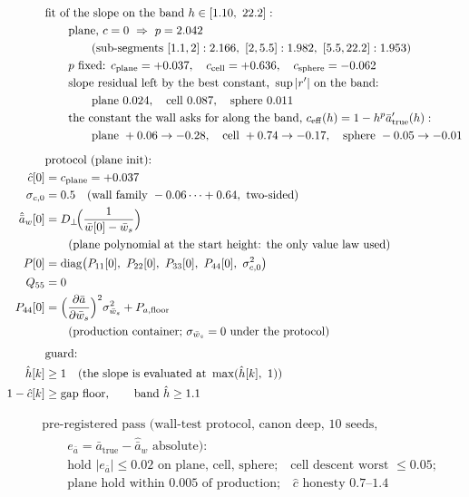 \documentclass[11pt,a4paper,fontset=none]{ctexart}
\newcommand{\ba}{\bar{a}}
\newcommand{\bw}{\bar{w}}
\newcommand{\ap}{\ba'}
\newcommand{\ah}{\hat{\ba}_w}
\newcommand{\hh}{\hat{h}}
\newcommand{\ch}{\hat{c}}
\newcommand{\Dp}{D_{\perp}}
\begin{document}
\begin{align*}
&\text{fit of the slope on the band } h \in [1.10,\ 22.2]: \\
&\qquad \text{plane, } c = 0 \ \Rightarrow\ p = 2.042 \\
&\qquad\qquad(\text{sub-segments } [1.1,2]: 2.166,\ [2,5.5]: 1.982,\ [5.5,22.2]: 1.953) \\
&\qquad p \text{ fixed: } c_{\mathrm{plane}} = +0.037,\quad c_{\mathrm{cell}} = +0.636,\quad c_{\mathrm{sphere}} = -0.062 \\
&\qquad \text{slope residual left by the best constant, } \sup|r'| \text{ on the band:} \\
&\qquad\qquad \text{plane } 0.024,\quad \text{cell } 0.087,\quad \text{sphere } 0.011 \\
&\qquad \text{the constant the wall asks for along the band, } c_{\mathrm{eff}}(h) = 1 - h^{p}\ap_{\mathrm{true}}(h): \\
&\qquad\qquad \text{plane } +0.06 \to -0.28,\quad \text{cell } +0.74 \to -0.17,\quad \text{sphere } -0.05 \to -0.01 \\[6pt]
&\text{protocol (plane init):} \\
\ch[0] &= c_{\mathrm{plane}} = +0.037 \\
\sigma_{c,0} &= 0.5 \quad(\text{wall family } -0.06 \dots +0.64,\ \text{two-sided}) \\
\ah[0] &= \Dp\!\Bigl(\frac{1}{\bw[0] - \bw_s}\Bigr) \\
       &\qquad(\text{plane polynomial at the start height: the only value law used}) \\
P[0]   &= \mathrm{diag}\bigl(P_{11}[0],\ P_{22}[0],\ P_{33}[0],\ P_{44}[0],\ \sigma_{c,0}^{2}\bigr) \\
Q_{55} &= 0 \\
P_{44}[0] &= \Bigl(\frac{\partial\ba}{\partial\bw_s}\Bigr)^{2}\sigma_{\bw_s}^{2} + P_{a,\mathrm{floor}} \\
          &\qquad(\text{production container; } \sigma_{\bw_s} = 0 \text{ under the protocol}) \\[4pt]
&\text{guard:} \\
\hh[k] &\ge 1 \quad(\text{the slope is evaluated at } \max(\hh[k],\ 1)) \\
1 - \ch[k] &\ge \text{gap floor}, \qquad \text{band } \hh \ge 1.1
\end{align*}

\begin{align*}
&\text{pre-registered pass (wall-test protocol, canon deep, 10 seeds,} \\
&\qquad e_{\ba} = \ba_{\mathrm{true}} - \ah \text{ absolute):} \\
&\qquad \text{hold } |e_{\ba}| \le 0.02 \text{ on plane, cell, sphere;}\quad \text{cell descent worst } \le 0.05; \\
&\qquad \text{plane hold within } 0.005 \text{ of production;}\quad \hat c \text{ honesty } 0.7\text{--}1.4
\end{align*}
\end{document}

